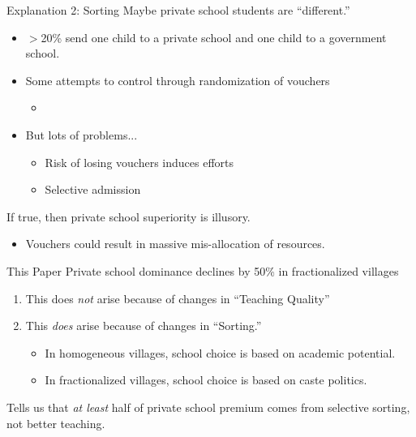 \documentclass{beamer}
\begin{document}
\begin{frame}{Explanation 2: Sorting}
Maybe private school students are ``different.''
\pause
	\begin{itemize}
			\item $>$20\%  send one child to a private school and one child to a government school.
			\pause
		\item Some attempts to control through randomization of vouchers
			\begin{itemize}
				\item \cite{Angrist:2002up, Bellei:2008uu}
			\end{itemize}
		\pause
		\item But lots of problems...
			\begin{itemize}
				\item Risk of losing vouchers induces efforts
				\item Selective admission
			\end{itemize}
	\end{itemize}	

\pause
If true, then private school superiority is illusory. 
\begin{itemize}
	\item Vouchers could result in massive mis-allocation of resources.
\end{itemize}
\end{frame}


\begin{frame}{This Paper}
\pause	
Private school dominance declines by 50\% in fractionalized villages
	\pause
\begin{enumerate}
	\item This does \emph{not} arise because of changes in ``Teaching Quality''
	\pause
	\item This \emph{does} arise because of changes in ``Sorting.''
	\pause
		\begin{itemize}
			\item In homogeneous villages, school choice is based on academic potential.
			\pause
			\item In fractionalized villages, school choice is based on caste politics.
		\end{itemize}
\end{enumerate}
\pause
Tells us that \emph{at least} half of private school premium comes from selective sorting, not better teaching.
\end{frame}
\end{document}
